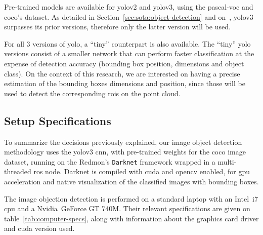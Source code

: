 Pre-trained models are available for \ac{yolo}v2 and \ac{yolo}v3, using the \ac{pascal-voc} and \ac{coco}'s dataset. As detailed in Section~\ref{sec:sota:object-detection} and on~\cite{Redmon2018}, \ac{yolo}v3 surpasses its prior versions, therefore only the latter version will be used. 

For all 3 versions of \ac{yolo}, a ``tiny'' counterpart is also available. The ``tiny'' \ac{yolo} versions consist of a smaller network that can perform faster classification at the expense of detection accuracy (bounding box position, dimensions and object class). On the context of this research, we are interested on having a precise estimation of the bounding boxes dimensions and position, since those will be used to detect the corresponding \acp{roi} on the point cloud. 

\subsection{Setup Specifications}
To summarize the decisions previously explained, our image object detection methodology uses the \ac{yolo}v3 \ac{cnn}, with pre-trained weights for the \ac{coco} image dataset, running on the Redmon's \texttt{Darknet} framework wrapped in a multi-threaded \ac{ros} node. Darknet is compiled with \ac{cuda} and \ac{opencv} enabled, for \ac{gpu} acceleration and native visualization of the classified images with bounding boxes.

The image objection detection is performed on a standard laptop with an Intel\cp~i7 \ac{cpu} and a Nvidia\cp~GeForce GT 740M. Their relevant specifications are given on table~\ref{tab:computer-specs}, along with information about the graphics card driver and \ac{cuda} version used.

